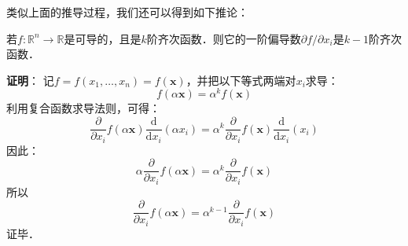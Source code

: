 类似上面的推导过程，我们还可以得到如下推论：
\begin{corollary}{}
若$f:\mathbb{R}^n \to \mathbb{R}$是可导的，且是$ k $阶齐次函数．则它的一阶偏导数$\partial f/\partial x_i$是$k-1$阶齐次函数．
\end{corollary}
\textbf{证明}： 记$ f=f(x_{1},\ldots ,x_{n})=f(\mathbf {x} )$，并把以下等式两端对$x_{i}$求导：
\begin{equation}
f(\alpha \mathbf {x} )=\alpha ^{k}f(\mathbf {x} )
\end{equation}
利用复合函数求导法则，可得：
\begin{equation}
\frac {\partial }{\partial x_{i}}f(\alpha \mathbf {x} ){\frac {\mathrm {d} }{\mathrm {d} x_{i}}}(\alpha x_{i})=\alpha ^{k}{\frac {\partial }{\partial x_{i}}}f(\mathbf {x} ){\frac {\mathrm {d} }{\mathrm {d} x_{i}}}(x_{i})
\end{equation}
因此：
\begin{equation}
\alpha {\frac {\partial }{\partial x_{i}}}f(\alpha \mathbf {x} )=\alpha ^{k}{\frac {\partial }{\partial x_{i}}}f(\mathbf {x} )
\end{equation}
所以
\begin{equation}
{\frac {\partial }{\partial x_{i}}}f(\alpha \mathbf {x} )=\alpha ^{k-1}{\frac {\partial }{\partial x_{i}}}f(\mathbf {x} )
\end{equation}
证毕．
